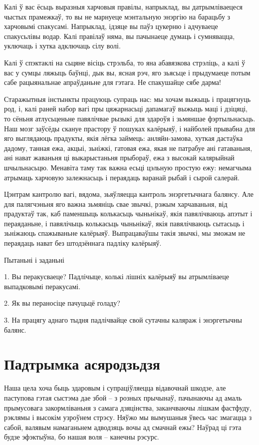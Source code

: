 Калі ў вас ёсьць выразныя харчовыя правілы, напрыклад, вы датрымліваецеся чыстых прамежкаў, то вы не марнуеце мэнтальную энэргію на барацьбу з харчовымі спакусамі. Напрыклад, ідзяце вы паўз цукерню і адчуваеце спакусьлівы водар. Калі правілаў няма, вы пачынаеце думаць і сумнявацца, уключаць і хутка адключаць сілу волі.

Калі ў спэктаклі на сьцяне вісіць стрэльба, то яна абавязкова стрэліць, а калі ў вас у сумцы ляжыць баўнці, дык вы, ясная рэч, яго зьясьце і прыдумаеце потым сабе рацыянальнае апраўданьне для гэтага. Не спакушайце сябе дарма!

Старажытныя інстынкты працуюць супраць нас: мы хочам выжыць і працягнуць род, і, калі раней набор вагі пры цяжарнасьці дапамагаў выжыць маці і дзіцяці, то сёньня атлусьценьне павялічвае рызыкі для здароўя і зьмяншае фэртыльнасьць. Наш мозг заўсёды скануе прастору ў пошуках калёрыяў, і найболей прывабна для яго выглядаюць прадукты, якія лёгка займець: анляйн-замова, хуткая дастаўка дадому, танная ежа, акцыі, зьніжкі, гатовая ежа, якая не патрабуе ані гатаваньня, ані нават жаваньня ці выкарыстаньня прыбораў, ежа з высокай калярыйнай шчыльнасьцю. Менавіта таму так важна есьці цэльную простую ежу: немагчыма атрымаць харчовую залежнасьць і пераядаць варанай рыбай і сырой салерай.

Цэнтрам кантролю вагі, вядома, зьяўляецца кантроль энэргетычнага балянсу. Але для палягчэньня яго важна зьмяніць свае звычкі, рэжым харчаваньня, від прадуктаў так, каб паменшыць колькасьць чыньнікаў, якія павялічваюць апэтыт і пераяданьне, і павялічыць колькасьць чыньнікаў, якія павялічваюць сытасьць і зьніжаюць спажываньне калёрыяў. Выпрацаваўшы такія звычкі, мы зможам не пераядаць нават без штодзённага падліку калёрыяў.

Пытаньні і заданьні

1. Вы перакусваеце? Падлічыце, колькі лішніх калёрыяў вы атрымліваеце выпадковымі перакусамі.

2. Як вы пераносіце пачуцьцё голаду?

3. На працягу аднаго тыдня падлічвайце свой сутачны каляраж і энэргетычны балянс.


\section{Падтрымка асяродзьдзя}

Наша цела хоча быць здаровым і супраціўляецца відавочнай шкодзе, але паступова гэтая сыстэма дае збой – з розных прычынаў, пачынаючы ад амаль прымусовага закормліваньня з самага дзяцінства, заканчваючы лішкам фастфуду, рэклямы і высокім узроўнем стрэсу. Няўжо мы вымушаныя ўвесь час змагацца з сабой, валявым намаганьнем адводзяць вочы ад смачнай ежы? Наўрад ці гэта будзе эфэктыўна, бо нашая воля – канечны рэсурс.

